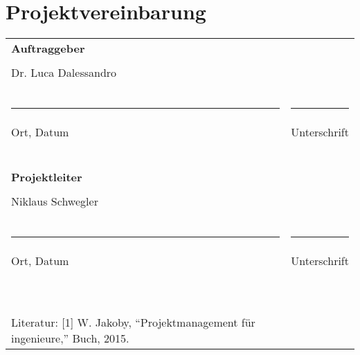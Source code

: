 \section{Projektvereinbarung}
\begin{tabular}{l l}
\textbf{Auftraggeber} &\\
&\\
Dr. Luca Dalessandro \\
&\\
&\\
&\\
\rule{6cm}{0.5pt} & \rule{6cm}{0.5pt}\\
Ort, Datum & Unterschrift\\
&\\
&\\
&\\
&\\
&\\
&\\
\textbf{Projektleiter} &\\
&\\
Niklaus Schwegler&\\
&\\
&\\
&\\
\rule{6cm}{0.5pt} & \rule{6cm}{0.5pt}\\
Ort, Datum & Unterschrift\\
&\\
&\\
&\\
&\\
&\\
&\\
&\\
&\\
&\\
&\\
Literatur: [1] W. Jakoby, “Projektmanagement für ingenieure,” Buch, 2015.
\end{tabular}

